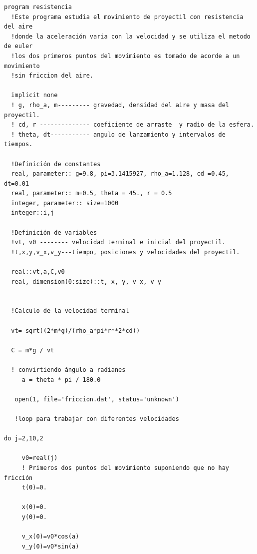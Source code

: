 \documentclass[12pt,a4paper,twoside]{article}
\begin{document}
\newpage
 
\begin{verbatim}
program resistencia
  !Este programa estudia el movimiento de proyectil con resistencia del aire
  !donde la aceleración varia con la velocidad y se utiliza el metodo de euler
  !los dos primeros puntos del movimiento es tomado de acorde a un movimiento
  !sin friccion del aire.
  
  implicit none
  ! g, rho_a, m--------- gravedad, densidad del aire y masa del proyectil.
  ! cd, r -------------- coeficiente de arraste  y radio de la esfera.
  ! theta, dt----------- angulo de lanzamiento y intervalos de tiempos.

  !Definición de constantes 
  real, parameter:: g=9.8, pi=3.1415927, rho_a=1.128, cd =0.45, dt=0.01
  real, parameter:: m=0.5, theta = 45., r = 0.5
  integer, parameter:: size=1000
  integer::i,j

  !Definición de variables
  !vt, v0 -------- velocidad terminal e inicial del proyectil.
  !t,x,y,v_x,v_y---tiempo, posiciones y velocidades del proyectil.
  
  real::vt,a,C,v0
  real, dimension(0:size)::t, x, y, v_x, v_y
  

  !Calculo de la velocidad terminal
  
  vt= sqrt((2*m*g)/(rho_a*pi*r**2*cd))
  
  C = m*g / vt
   
  ! convirtiendo ángulo a radianes
     a = theta * pi / 180.0
  
   open(1, file='friccion.dat', status='unknown')  

   !loop para trabajar con diferentes velocidades 

do j=2,10,2
    
     v0=real(j)
     ! Primeros dos puntos del movimiento suponiendo que no hay fricción  
     t(0)=0.
     
     x(0)=0.
     y(0)=0.
     
     v_x(0)=v0*cos(a)
     v_y(0)=v0*sin(a)   
\end{verbatim}
 
\end{document}
